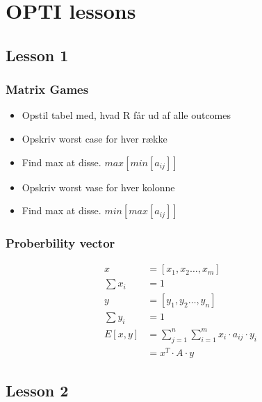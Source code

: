 \documentclass[danish, 10pt]{Memoir}
\begin{document}
\chapter{OPTI lessons}

\section{Lesson 1} %
\label{sec:lesson_1}

\subsection{Matrix Games}

\begin{itemize}
	\item Opstil tabel med, hvad R får ud af alle outcomes
	\item Opskriv worst case for hver række
	\item[] Find max at disse. $max[min[a_{ij}]]$
	\item Opskriv worst vase for hver kolonne
	\item[] Find max at disse.  $min[max[a_{ij}]]$
\end{itemize}

\subsection{Proberbility vector}

\begin{align}
x &= [x_1, x_2 \ldots, x_m] \\
\sum x_i &= 1\\
y &= [y_1, y_2 \ldots, y_n] \\
\sum y_i &= 1\\
E[x,y] &= \sum_{j=1}^n \sum_{i=1}^m x_i \cdot a_{ij} \cdot y_i \\
	&= x^T \cdot A \cdot y
\end{align}




\section{Lesson 2}
\end{document}
